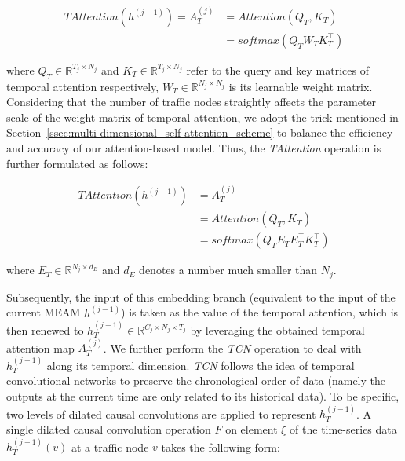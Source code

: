 \begin{equation}
    \label{eqn:temporal_attention}
    \begin{aligned}
        TAttention(h^{(j-1)})  = A_T^{(j)} & = Attention(Q_T, K_T)      \\
                                           & = softmax(Q_T W_T K_T^\top)
    \end{aligned}
\end{equation}

where $Q_T \in \mathbb{R}^{T_j \times N_j}$ and $K_T \in \mathbb{R}^{T_j \times N_j}$ refer to the query and key matrices of temporal attention respectively, $W_T \in \mathbb{R}^{N_j \times N_j}$ is its learnable weight matrix. Considering that the number of traffic nodes straightly affects the parameter scale of the weight matrix of temporal attention, we adopt the trick mentioned in Section~\ref{ssec:multi-dimensional_self-attention_scheme} to balance the efficiency and accuracy of our attention-based model. Thus, the \textit{TAttention} operation is further formulated as follows:

\begin{equation}
    \label{eqn:trick_temporal_attention}
    \begin{aligned}
        TAttention(h^{(j-1)}) & = A_T^{(j)}                        \\
                              & = Attention(Q_T, K_T)              \\
                              & = softmax(Q_T E_T E_T^\top K_T^\top)
    \end{aligned}
\end{equation}

where $E_T \in \mathbb{R}^{N_j \times d_E}$ and $d_E$ denotes a number much smaller than $N_j$.

Subsequently, the input of this embedding branch (equivalent to the input of the current MEAM $h^{(j-1)}$) is taken as the value of the temporal attention, which is then renewed to $h_T^{(j-1)} \in \mathbb{R}^{C_j \times N_j \times T_j}$ by leveraging the obtained temporal attention map $A_T^{(j)}$. We further perform the \textit{TCN} operation to deal with $h_T^{(j-1)}$ along its temporal dimension. \textit{TCN} follows the idea of temporal convolutional networks \cite{bai2018empirical} to  preserve the chronological order of data (namely the outputs at the current time are only related to its historical data). To be specific, two levels of dilated causal convolutions are applied to represent $h_T^{(j-1)}$. A single dilated causal convolution operation $F$ on element $\xi$ of the time-series data $h_T^{(j-1)}(v)$ at a traffic node $v$ takes the following form:

